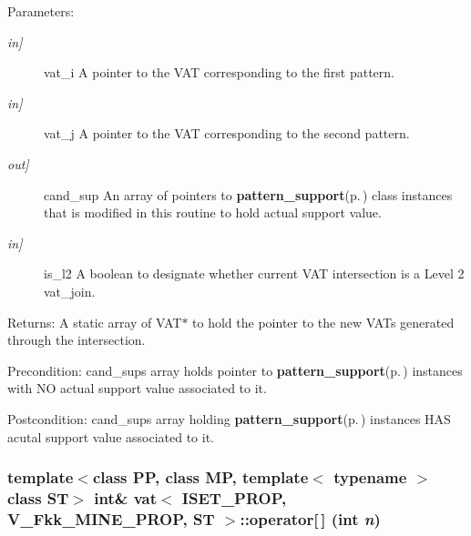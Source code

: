\begin{Desc}
\item[Parameters:]
\begin{description}
\item[{\em in\mbox{]}}]vat\_\-i A pointer to the VAT corresponding to the first pattern. \item[{\em in\mbox{]}}]vat\_\-j A pointer to the VAT corresponding to the second pattern. \item[{\em out\mbox{]}}]cand\_\-sup An array of pointers to {\bf pattern\_\-support}{\rm (p.\,\pageref{classpattern__support})} class instances that is modified in this routine to hold actual support value. \item[{\em in\mbox{]}}]is\_\-l2 A boolean to designate whether current VAT intersection is a Level 2 vat\_\-join. \end{description}
\end{Desc}
\begin{Desc}
\item[Returns:]A static array of VAT$\ast$ to hold the pointer to the new VATs generated through the intersection. \end{Desc}
\begin{Desc}
\item[Precondition:]cand\_\-sups array holds pointer to {\bf pattern\_\-support}{\rm (p.\,\pageref{classpattern__support})} instances with NO actual support value associated to it. \end{Desc}
\begin{Desc}
\item[Postcondition:]cand\_\-sups array holding {\bf pattern\_\-support}{\rm (p.\,\pageref{classpattern__support})} instances HAS acutal support value associated to it. \end{Desc}
\subsubsection{\setlength{\rightskip}{0pt plus 5cm}template$<$class PP, class MP, template$<$ typename $>$ class ST$>$ int\& {\bf vat}$<$ ISET\_\-PROP, V\_\-Fkk\_\-MINE\_\-PROP, ST $>$::operator[$\,$] (int {\em n})\hspace{0.3cm}{\tt  [inline]}}\label{classvat_3_01ISET__PROP_00_01V__Fkk__MINE__PROP_00_01ST_01_4_a9}


